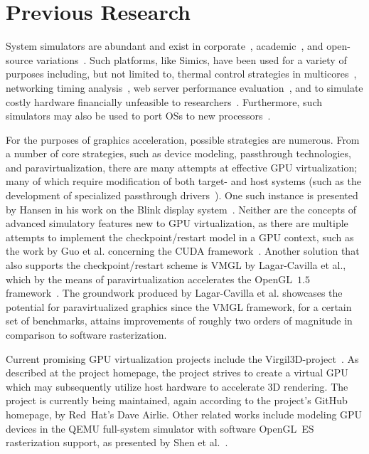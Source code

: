 
\section{Previous Research}
\label{sec:previousresearch}
System simulators are abundant and exist in corporate~, academic~, and open-source variations~.
Such platforms, like Simics, have been used for a variety of purposes including, but not limited to, thermal control strategies in multicores~, networking timing analysis~, web server performance evaluation~, and to simulate costly hardware financially unfeasible to researchers~.
Furthermore, such simulators may also be used to port OSs to new processors~.

For the purposes of graphics acceleration, possible strategies are numerous.
From a number of core strategies, such as device modeling, passthrough technologies, and paravirtualization, there are many attempts at effective GPU virtualization; many of which require modification of both target- and host systems (such as the development of specialized passthrough drivers~).
One such instance is presented by Hansen in his work on the Blink display system~.
Neither are the concepts of advanced simulatory features new to GPU virtualization, as there are multiple attempts to implement the checkpoint/restart model in a GPU context, such as the work by Guo et al. concerning the CUDA framework~.
Another solution that also supports the checkpoint/restart scheme is VMGL by Lagar-Cavilla et al., which by the means of paravirtualization accelerates the OpenGL~$1.5$ framework~.
The groundwork produced by Lagar-Cavilla et al. showcases the potential for paravirtualized graphics since the VMGL framework, for a certain set of benchmarks, attains improvements of roughly two orders of magnitude in comparison to software rasterization.

Current promising GPU virtualization projects include the Virgil3D-project~.
As described at the project homepage, the project strives to create a virtual GPU which may subsequently utilize host hardware to accelerate 3D rendering.
The project is currently being maintained, again according to the project's GitHub homepage, by Red~Hat's Dave Airlie.
Other related works include modeling GPU devices in the QEMU full-system simulator with software OpenGL~ES rasterization support, as presented by Shen et al.~.

